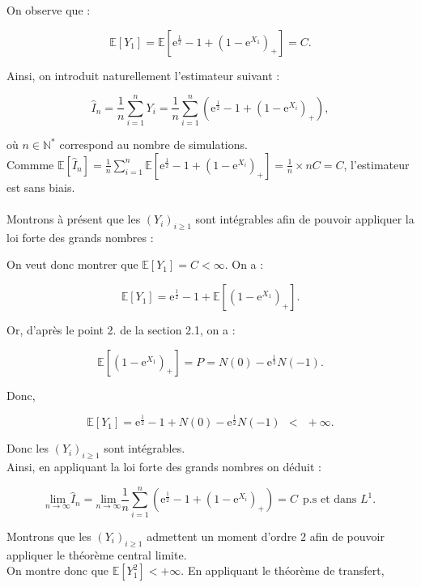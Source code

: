 \documentclass{article}
\theoremstyle{exostyle}
\newenvironment{questions}{
\begin{enumerate}[\hspace{12pt} 1.]}{\end{enumerate}}
\begin{document}
\begin{questions}
On observe que : 

\[\mathbb{E} [Y_{1}] = \mathbb{E} \left[ \text{e}^{\frac{1}{2}} - 1 + \left( 1 - \text{e}^{X_{1}} \right)_{+} \right] = C.\]

Ainsi, on introduit naturellement l'estimateur suivant :

\[\hat{I}_{n} = \frac{1}{n} \sum_{i=1}^{n} Y_{i} = \frac{1}{n} \sum_{i=1}^{n} \left( \text{e}^{\frac{1}{2}} - 1 +  \left( 1-\text{e}^{X_{i}} \right)_{+}\right),\]

où $n \in \mathbb{N}^{*}$ correspond au nombre de simulations.\\

Commme $\mathbb{E} [\hat{I}_{n}] = \frac{1}{n} \sum_{i=1}^{n} \mathbb{E} \left[ \text{e}^{\frac{1}{2}} - 1 +  \left(1-\text{e}^{X_{i}} \right)_{+}\right] = \frac{1}{n} \times nC = C$, l'estimateur est sans biais.\\
\\

Montrons à présent que les $(Y_{i})_{i \geq 1}$ sont intégrables afin de pouvoir appliquer la loi forte des grands nombres :

On veut donc montrer que $\mathbb{E}[Y_{1}] = C < \infty$. On a : 

\[\mathbb{E}[Y_{1}] = \text{e}^{\frac{1}{2}} - 1 + \mathbb{E}  \left[ \left( 1 - \text{e}^{X_{1}} \right)_{+} \right].\]

Or, d'après le point 2. de la section 2.1, on a : 

\[ \mathbb{E}  \left[ \left( 1 - \text{e}^{X_{1}} \right)_{+} \right] = P = N(0) - \text{e}^{\frac{1}{2}}N(-1).\]

Donc, 

\[\mathbb{E}[Y_{1}] = \text{e}^{\frac{1}{2}} - 1 + N(0) - \text{e}^{\frac{1}{2}}N(-1) \ \ < \ \ +\infty.\]

Donc les $(Y_{i})_{i \geq 1}$ sont intégrables.\\
Ainsi, en appliquant la loi forte des grands nombres on déduit : 

\[\underset{n \to \infty}{\text{lim}} \hat{I}_{n} = \underset{n \to \infty}{\text{lim}} \frac{1}{n} \sum_{i=1}^{n} \left( \text{e}^{\frac{1}{2}} - 1 +\left( 1- \text{e}^{X_{i}} \right)_{+} \right) = C \ \ \text{p.s et dans $L^{1}$}.\]

Montrons que les $(Y_{i})_{i \geq 1}$ admettent un moment d'ordre $2$ afin de pouvoir appliquer le théorème central limite.\\
On montre donc que $\mathbb{E}[Y_{1}^{2}] < + \infty$. En appliquant le théorème de transfert,


\end{questions}
\end{document}
